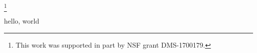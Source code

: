 \documentclass[epub]{gsm-l}
\begin{document}
\thanks{This work was supported in part by NSF grant DMS-1700179.}

\frontmatter

\setcounter{page}{5}
\thispagestyle{empty}

\cleardoublepage


\tableofcontents

\insertAMSDRMstatement

hello, world
\end{document}
